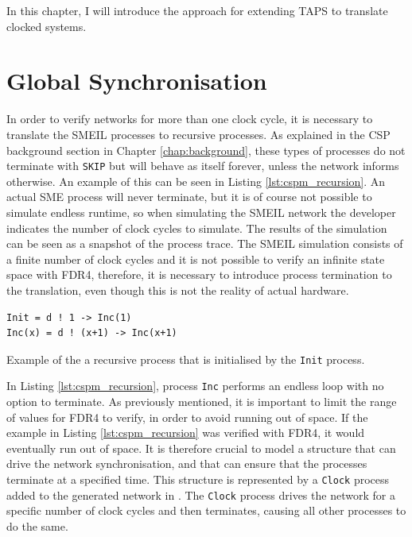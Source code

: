 In this chapter, I will introduce the approach for extending TAPS to translate clocked systems.
\section{Global Synchronisation}
In order to verify networks for more than one clock cycle, it is necessary to translate the SMEIL processes to recursive \cspm{} processes. As explained in the CSP background section in Chapter \ref{chap:background}, these types of processes do not terminate with \texttt{SKIP} but will behave as itself forever, unless the network informs otherwise.
An example of this can be seen in Listing \ref{lst:cspm_recursion}.
An actual SME process will never terminate, but it is of course not possible to simulate endless runtime, so when simulating the SMEIL network the developer indicates the number of clock cycles to simulate. The results of the simulation can be seen as a snapshot of the process trace. The SMEIL simulation consists of a finite number of clock cycles and it is not possible to verify an infinite state space with FDR4, therefore, it is necessary to introduce process termination to the translation, even though this is not the reality of actual hardware. \\
\begin{listing}
\begin{verbatim}
Init = d ! 1 -> Inc(1)
Inc(x) = d ! (x+1) -> Inc(x+1)
\end{verbatim}
\caption{Example of the a recursive \cspm{} process that is initialised by the \texttt{Init} process.}
\label{lst:cspm_recursion}
\end{listing}

In Listing \ref{lst:cspm_recursion}, process \texttt{Inc} performs an endless loop with no option to terminate. As previously mentioned, it is important to limit the range of values for FDR4 to verify, in order to avoid running out of space. If the example in Listing \ref{lst:cspm_recursion} was verified with FDR4, it would eventually run out of space. It is therefore crucial to model a structure that can drive the network synchronisation, and that can ensure that the processes terminate at a specified time. This structure is represented by a \texttt{Clock} process added to the generated network in \cspm{}. The \texttt{Clock} process drives the network for a specific number of clock cycles and then terminates, causing all other processes to do the same. \\

